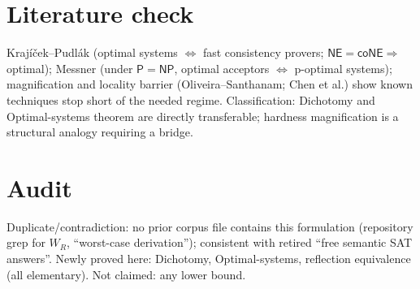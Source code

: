 \documentclass{article}\usepackage{amsmath,amssymb,amsthm}
\begin{document}
\section*{Literature check}
Krajíček--Pudlák (optimal systems $\Leftrightarrow$ fast consistency provers; $\mathsf{NE}=\mathsf{coNE}\Rightarrow$ optimal); Messner (under $\mathsf P=\mathsf{NP}$, optimal acceptors $\Leftrightarrow$ p-optimal systems); magnification and locality barrier (Oliveira--Santhanam; Chen et al.) show known techniques stop short of the needed regime. Classification: Dichotomy and Optimal-systems theorem are directly transferable; hardness magnification is a structural analogy requiring a bridge.

\section*{Audit}
Duplicate/contradiction: no prior corpus file contains this formulation (repository grep for $W_R$, ``worst-case derivation''); consistent with retired ``free semantic SAT answers''. Newly proved here: Dichotomy, Optimal-systems, reflection equivalence (all elementary). Not claimed: any lower bound.
\end{document}
